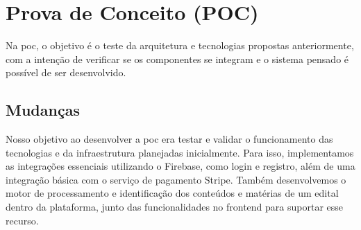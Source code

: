 \section{Prova de Conceito (POC)}

Na \ac{poc}, o objetivo é o teste da arquitetura e tecnologias propostas anteriormente, com a intenção de verificar se os componentes se integram e o sistema pensado é possível de ser desenvolvido.

\subsection{Mudanças}

Nosso objetivo ao desenvolver a \acs{poc} era testar e validar o funcionamento das tecnologias e da infraestrutura planejadas inicialmente. Para isso, implementamos as integrações essenciais utilizando o Firebase, como login e registro, além de uma integração básica com o serviço de pagamento Stripe. Também desenvolvemos o motor de processamento e identificação dos conteúdos e matérias de um edital dentro da plataforma, junto das funcionalidades no frontend para suportar esse recurso.


	

 


